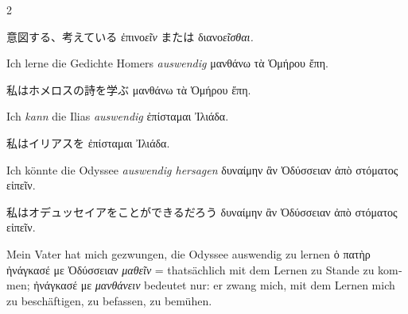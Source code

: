 \begin{paracol}{2}
\begin{enumerate}[leftmargin=0pt,rightmargin=0pt,listparindent =1cm,labelindent=1cm,labelsep=1ex,labelwidth={*},itemindent={*},align=left]
\begin{japanese}
意図する、考えている \textgreek[variant=ancient]{ἐπινο\emph{εῖν}}
または \textgreek[variant=ancient]{διανο\emph{εῖσθαι.}}
\end{japanese}
\switchcolumn*

\begin{german}
\item Ich lerne die Gedichte Homers \emph{auswendig} \textgreek[variant=ancient]{μανθάνω
τὰ Ὁμήρου ἔπη.}
\end{german}
\switchcolumn

\begin{japanese}
私はホメロスの詩を学ぶ \textgreek[variant=ancient]{μανθάνω
τὰ Ὁμήρου ἔπη.}
\end{japanese}
\switchcolumn*

\begin{continuousitemline}
\begin{german}
Ich \emph{kann} die Ilias \emph{auswendig}
\textgreek[variant=ancient]{ἐπίσταμαι Ἰλιάδα.}
\end{german}
\switchcolumn

\begin{japanese}
私はイリアスを \textgreek[variant=ancient]{ἐπίσταμαι Ἰλιάδα.}
\end{japanese}
\switchcolumn*

\begin{german}
Ich könnte die Odyssee \emph{auswendig hersagen} \textgreek[variant=ancient]{δυναίμην
ἂν Ὀδύσσειαν ἀπὸ στόματος εἰπεῖν. }
\end{german}
\switchcolumn

\begin{japanese}
私はオデュッセイアをことができるだろう
\textgreek[variant=ancient]{δυναίμην ἂν Ὀδύσσειαν ἀπὸ στόματος εἰπεῖν.}
\end{japanese}
\switchcolumn*
\end{continuousitemline}

\begin{german}
\item Mein Vater hat mich gezwungen, die Odyssee auswendig zu lernen \textgreek[variant=ancient]{ὁ
πατὴρ ἠνάγκασέ με Ὀδύσσειαν \emph{μαθεῖν}} = that\textcompwordmark{}sächlich
mit dem Lernen zu Stande zu kommen; \textgreek[variant=ancient]{ἠνάγκασέ
με \emph{μανθάνειν}} bedeutet nur: er zwang mich, mit dem Lernen mich
zu beschäftigen, zu befassen, zu bemühen. 
\end{german}
\switchcolumn


\end{enumerate}
\end{paracol}
